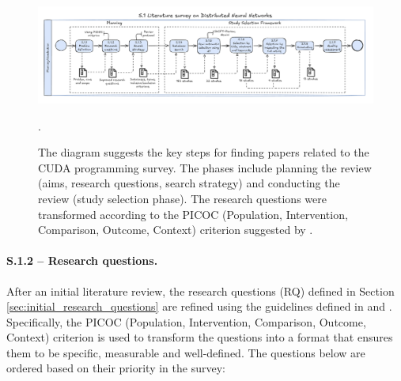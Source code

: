 \begin{figure}[th]
	\centering
	\includegraphics[width=\linewidth]{figures/survey-dnn.pdf}
	\caption{The diagram suggests the key steps for finding papers related to the CUDA programming survey. The phases
		include planning the review (aims, research questions, search strategy) and conducting the review (study selection phase). The research questions
		were transformed according to the PICOC (Population, Intervention, Comparison, Outcome, Context) criterion suggested by \cite{keele_systematic_2007}.}.
	\label{fig:workflow-study-cuda}
\end{figure}

\paragraph{S.1.2 -- Research questions.}
After an initial literature review, the research questions (RQ) defined in Section
\ref{sec:initial_research_questions} are refined using the guidelines defined in
\cite{kitchenham_evidence-based_2015} and \cite{keele_systematic_2007}. Specifically, the PICOC
(Population, Intervention, Comparison, Outcome, Context) criterion is used to transform the
questions into a format that ensures them to be specific, measurable and well-defined. The
questions below are ordered based on their priority in the survey:



